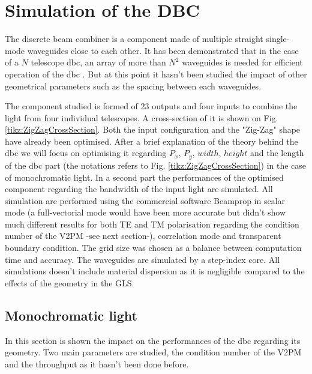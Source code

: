 \documentclass[a4paper,twoside,11pt]{article}
\begin{document}


\newpage
\section{Simulation of the DBC}
    
    The discrete beam combiner is a component made of multiple straight single-mode waveguides close to each other. It has been demonstrated that in the case of a $N$ telescope \gls{dbc}, an array of more than $N^2$ waveguides is needed for efficient operation of the \gls{dbc} \cite{minardi1}. But at this point it hasn't been studied the impact of other geometrical parameters such as the spacing between each waveguides. 
    
    The component studied is formed of 23 outputs and four inputs to combine the light from four individual telescopes. A cross-section of it is shown on Fig. \ref{tikz:ZigZagCrossSection}. Both the input configuration and the "Zig-Zag" shape have already been optimised. After a brief explanation of the theory behind the \gls{dbc} we will focus on optimising it regarding $P_x$, $P_y$, $width$, $height$ and the length of the \gls{dbc} part (the notations refers to Fig. \ref{tikz:ZigZagCrossSection}) in the case of monochromatic light. In a second part the performances of the optimised component regarding the bandwidth of the input light are simulated. All simulation are performed using the commercial software Beamprop\textcompwordmark{} in scalar mode (a full-vectorial mode would have been more accurate but didn't show much different results for both TE and TM polarisation regarding the condition number of the \gls{V2PM} -see next section-), correlation mode and transparent boundary condition. The grid size was chosen as a balance between computation time and accuracy. The waveguides are simulated by a step-index core. All simulations doesn't include material dispersion as it is negligible compared to the effects of the geometry in the GLS.
    
    

    \subsection{Monochromatic light}

    In this section is shown the impact on the performances of the \gls{dbc} regarding its geometry. Two main parameters are studied, the condition number of the \gls{V2PM} and the throughput as it hasn't been done before. 
\end{document}
